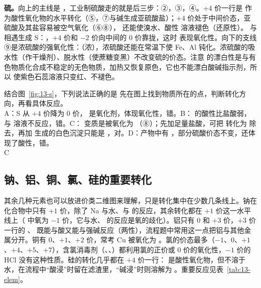 \textbf{硫。}向上的主线是 ，工业制硫酸走的就是后三步：②，③，④。$+4$ 价一行是  作为酸性氧化物的水平转化（⑤，⑦与碱生成亚硫酸盐）；$+4$ 价处于中间价态，亚硫酸及其盐容易被空气氧化（⑥⑧）， 还能使溴水、酸性  溶液褪色（还原性）。 与  相遇生成 S：，$+4$ 价和 $-2$ 价向中间的 0 价靠拢，这时  表现氧化性。向下的支线⑨是浓硫酸的强氧化性：（浓），浓硫酸还能在常温下使 Fe、Al 钝化。浓硫酸的吸水性（作干燥剂）、脱水性（使蔗糖变黑）不改变硫的价态。注意  的漂白性是与有色物质化合成不稳定的无色物质，加热又恢复原色，它也不能漂白酸碱指示剂，所以  使紫色石蕊溶液只变红、不褪色。

\begin{liti}[典型\quad 原创]
结合图~\ref{fig:13-s}，下列说法正确的是\xz
{}
\tcblower
\silu 先在图上找到物质所在的点，判断转化方向，再看具体反应。\\
\jie A：S 从 $+4$ 价降为 0 价， 是氧化剂，体现氧化性，错。B： 的酸性比盐酸弱， 与  溶液不反应，错。C： 变质是被氧化为 （⑧）；先加足量盐酸，可把  转化为  除去，再加  生成的白色沉淀只能是 ，对。D：产物中有 ，部分硫酸价态不变，还体现了酸性，错。\\
\daan C
\end{liti}

\subsection{钠、铝、铜、氯、硅的重要转化}
其余几种元素也可以放进价类二维图来理解，只是转化集中在少数几条线上。钠在化合物中只有 $+1$ 价，除了 Na 与水、与  的反应，其余转化都在 $+1$ 价这一水平线上（ 中氧为 $-1$ 价，它与水、 的反应是氧的歧化）。铝只有 0 和 $+3$ 价，$+3$ 价一行的 、 既能与酸又能与强碱反应（两性），流程题中常用这一点把铝与其他金属分开。铜有 0、$+1$、$+2$ 价，常考 Cu 被氧化为 。氯的价态最多（$-1$、0、$+1$、$+4$、$+5$、$+7$），含氯消毒剂（、、）都利用氯的正价或 0 价的氧化性，$-1$ 价的 HCl 没有这种性质。硅的转化几乎都在 $+4$ 价一行： 是酸性氧化物，但不溶于水，在流程中“酸浸”时留在滤渣里，“碱浸”时则溶解为 。重要反应见表~\ref{tab:13-elem}。

